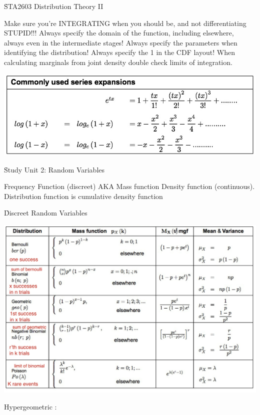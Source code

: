 \documentclass{/out/app/latex/examnotes}
\begin{document}
\obeylines

\h{STA2603 Distribution Theory II}

\ra Make sure you're INTEGRATING when you should be, and not differentiating STUPID!!!
\ra Always specify the domain of the function, including elsewhere, always even in the intermediate stages!
\ra Always specify the parameters when identifying the distribution!
\ra Always specify the 1 in the CDF layout!
\ra When calculating marginals from joint density double check limits of integration.

\vspace{6pt}
\includegraphics[scale=0.5]{./img/expan.jpg}

\h{Study Unit 2: Random Variables}

\ra Frequency Function (discreet) AKA Mass function
\ra Density function (continuous).
\ra Distribution function is cumulative density function

\h{Discreet Random Variables}

\includegraphics[scale=0.5]{./img/disscreet.jpg}

\disobeylines
Hypergeometric :
\obeylines
\end{document}
